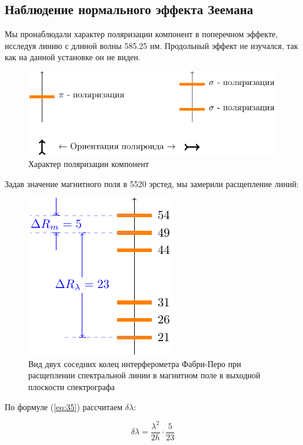 \subsection{Наблюдение нормального эффекта Зеемана}

Мы пронаблюдали характер поляризации компонент в поперечном эффекте, исследуя линию с  длиной волны  585.25 нм. Продольный эффект не изучался, так как на данной установке он не виден.

\begin{figure}[H]
	\centering
	\includegraphics[scale=1]{ris/2a}
	\caption{Характер поляризации компонент}
	\label{fig:ris2a}
\end{figure}

Задав значение магнитного поля в 5520 эрстед, мы замерили расщепление линий:

\begin{figure}[H]
	\centering
	\includegraphics[scale=1]{ris/2b}
	\caption{Вид двух соседних колец интерферометра Фабри-Перо при расщеплении спектральной линии в магнитном поле в выходной плоскости спектрографа}
	\label{fig:ris2b}
\end{figure}

По формуле (\ref{eq:35}) рассчитаем $\delta\lambda$:

\begin{equation}
 	\delta \lambda=\frac{\lambda^2}{2h}\cdot\frac{5}{23}
 \end{equation} 

